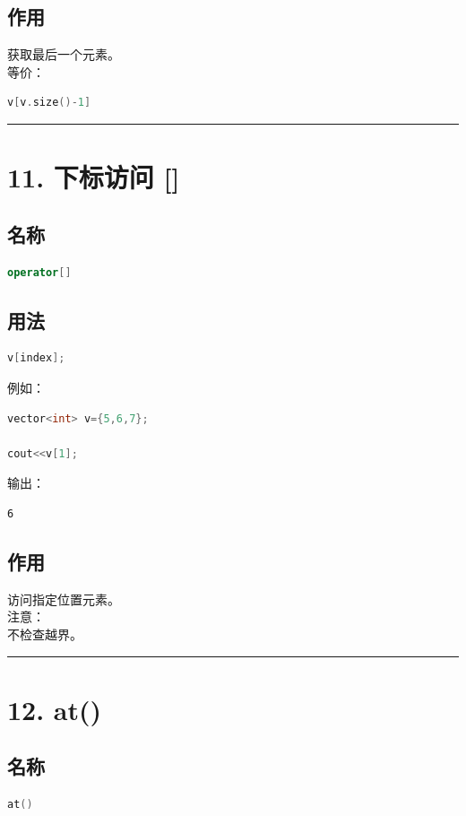 \documentclass[9pt,twocolumn]{extarticle}
\begin{document}
\subsection{作用}
获取最后一个元素。\\
等价：
\begin{lstlisting}[language=C++]
v[v.size()-1]
\end{lstlisting}

\noindent\rule{\linewidth}{0.4pt}

\section{11. 下标访问 []}

\subsection{名称}
\begin{lstlisting}[language=C++]
operator[]
\end{lstlisting}

\subsection{用法}
\begin{lstlisting}[language=C++]
v[index];
\end{lstlisting}
例如：
\begin{lstlisting}[language=C++]
vector<int> v={5,6,7};

cout<<v[1];
\end{lstlisting}
输出：
\begin{lstlisting}
6
\end{lstlisting}

\subsection{作用}
访问指定位置元素。\\
注意：\\
不检查越界。

\noindent\rule{\linewidth}{0.4pt}

\section{12. at()}

\subsection{名称}
\begin{lstlisting}[language=C++]
at()
\end{lstlisting}
\end{document}
